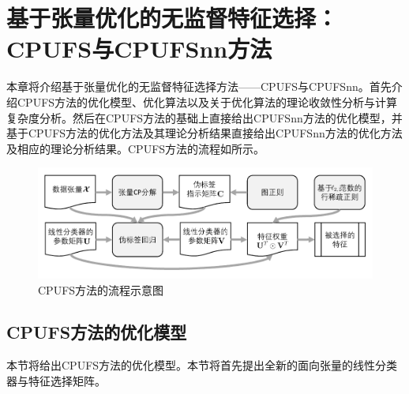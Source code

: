 \chapter[基于张量优化的无监督特征选择：CPUFS与CPUFSnn方法]{基于张量优化的无监督特征选择：\\CPUFS与CPUFSnn方法}\label{chap:cpufs}

本章将介绍基于张量优化的无监督特征选择方法——CPUFS与CPUFSnn。首先介绍CPUFS方法的优化模型、优化算法以及关于优化算法的理论收敛性分析与计算复杂度分析。然后在CPUFS方法的基础上直接给出CPUFSnn方法的优化模型，并基于CPUFS方法的优化方法及其理论分析结果直接给出CPUFSnn方法的优化方法及相应的理论分析结果。CPUFS方法的流程如所示。


\begin{figure}[!ht]
	\centering
    \includegraphics[width=\linewidth]{figures/CPUFS_cn.pdf}
	\caption{CPUFS方法的流程示意图}
	\label{fig:CPUFS-routine}
\end{figure}
\vspace{-0.5em}

\section{CPUFS方法的优化模型}
本节将给出CPUFS方法的优化模型。本节将首先提出全新的面向张量的线性分类器与特征选择矩阵。

